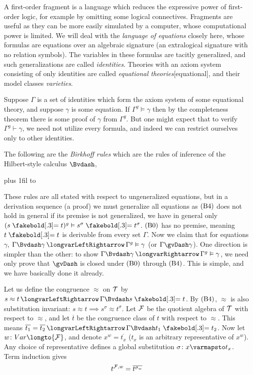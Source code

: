 A first-order fragment is a language which reduces the expressive power of first-order logic, for example by omitting some logical connectives.
Fragments are useful as they can be more easily simulated by a computer, whose computational power is limited.
We will deal with the {\it language of equations} closely here, whose formulas are equations over an algebraic signature (an extralogical signature with no relation symbols).
The variables in these formulas are tacitly generalized, and such generalizations are called {\it identities}.
Theories with an axiom system consisting of only identities are called {\it equational theories}[equational], and their model classes {\it varieties}.

Suppose $\Gamma$ is a set of identities which form the axiom system of some equational theory, and suppose $\gamma$ is some equation.
If $\Gamma^g\vDash\gamma$ then by the completeness theorem there is some proof of $\gamma$ from $\Gamma^g$.
But one might expect that to verify $\Gamma^g\vdash\gamma$, we need not utilize every formula, and indeed we can restrict ourselves only to other identities.

The following are the {\it Birkhoff rules} which are the rules of inference of the Hilbert-style calculus $\Bvdash$,

\medskip
{\tabskip=0pt plus 1fil
\jot\halign to}
\medskip

These rules are all stated with respect to ungeneralized equations, but in a derivation sequence (a proof) we must generalize all equations as $\rm(B4)$ does not hold in general if its premise is not
generalized, we have in general only $(s\eq t)^g\vDash s^\sigma\eq t^\sigma$.
$\rm(B0)$ has no premise, meaning $t\eq t$ is derivable from every set $\Gamma$.
Now we claim that for equations $\gamma$, $\Gamma\Bvdash\gamma\iff\Gamma^g\vDash\gamma$ (or $\Gamma\gvDash\gamma$).
One direction is simpler than the other: to show $\Gamma\Bvdash\gamma\implies\Gamma^g\vDash\gamma$, we need only prove that $\gvDash$ is closed under $({\rm B}0)$ through $({\rm B}4)$.
This is simple, and we have basically done it already.

Let us define the congruence $\approx$ on ${\cal T}$ by $s\approx t\iff\Gamma\Bvdash s\eq t$.
By $({\rm B}4)$, $\approx$ is also substitution invariant: $s\approx t\implies s^\sigma\approx t^\sigma$.
Let ${\cal F}$ be the quotient algebra of ${\cal T}$ with respect to $\approx$, and let $\overline t$ be the congruence class of $t$ with respect to $\approx$.
This means $\overline{t_1}=\overline{t_2}\iff\Gamma\Bvdash t_1\eq t_2$.
Now let $w\colon\Var\longto{\cal F}$, and denote $x^w=\overline{t_x}$ ($t_x$ is an arbitrary representative of $x^w$).
Any choice of representative defines a global substitution $\sigma\colon x\varmapsto t_x$.
Term induction gives
$$ t^{{\cal F},w}=\overline{t^{\sigma_w}} $$


